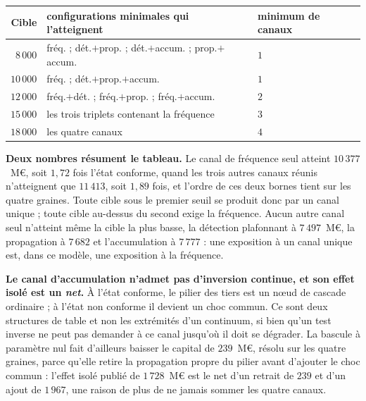 \begin{center}\footnotesize
\renewcommand{\arraystretch}{1.2}
\begin{tabular}{@{}r l l@{}}
\toprule
\textbf{Cible} & \textbf{configurations minimales qui l'atteignent} & \textbf{minimum de canaux} \\
\midrule
$8\,000$ & fréq. ; dét.$+$prop. ; dét.$+$accum. ; prop.$+$accum. & $1$ \\
$10\,000$ & fréq. ; dét.$+$prop.$+$accum. & $1$ \\
$12\,000$ & fréq.$+$dét. ; fréq.$+$prop. ; fréq.$+$accum. & $2$ \\
$15\,000$ & les trois triplets contenant la fréquence & $3$ \\
$18\,000$ & les quatre canaux & $4$ \\
\bottomrule
\end{tabular}
\end{center}

\vspace{4pt}
\noindent \textbf{Deux nombres résument le tableau.} Le canal de fréquence seul atteint
$10\,377$~M\euro, soit $1{,}72$ fois l'état conforme, quand les trois autres canaux réunis
n'atteignent que $11\,413$, soit $1{,}89$ fois, et l'ordre de ces deux bornes tient sur les quatre
graines. Toute cible sous le premier seuil se produit donc par un canal unique ; toute cible
au-dessus du second exige la fréquence. Aucun autre canal seul n'atteint même la cible la plus
basse, la détection plafonnant à $7\,497$~M\euro, la propagation à $7\,682$ et l'accumulation à
$7\,777$ : une exposition à un canal unique est, dans ce modèle, une exposition à la fréquence.

\begin{attention}
\textbf{Le canal d'accumulation n'admet pas d'inversion continue, et son effet isolé est un
\emph{net}.} À l'état conforme, le pilier des tiers est un n\oe{}ud de cascade ordinaire ; à l'état
non conforme il devient un choc commun. Ce sont deux structures de table et non les extrémités d'un
continuum, si bien qu'un test inverse ne peut pas demander à ce canal jusqu'où il doit se dégrader.
La bascule à paramètre nul fait d'ailleurs baisser le capital de $239$~M\euro, résolu sur les
quatre graines, parce qu'elle retire la propagation propre du pilier avant d'ajouter le choc
commun : l'effet isolé publié de $1\,728$~M\euro{} est le net d'un retrait de $239$ et d'un ajout
de $1\,967$, une raison de plus de ne jamais sommer les quatre canaux.
\end{attention}

